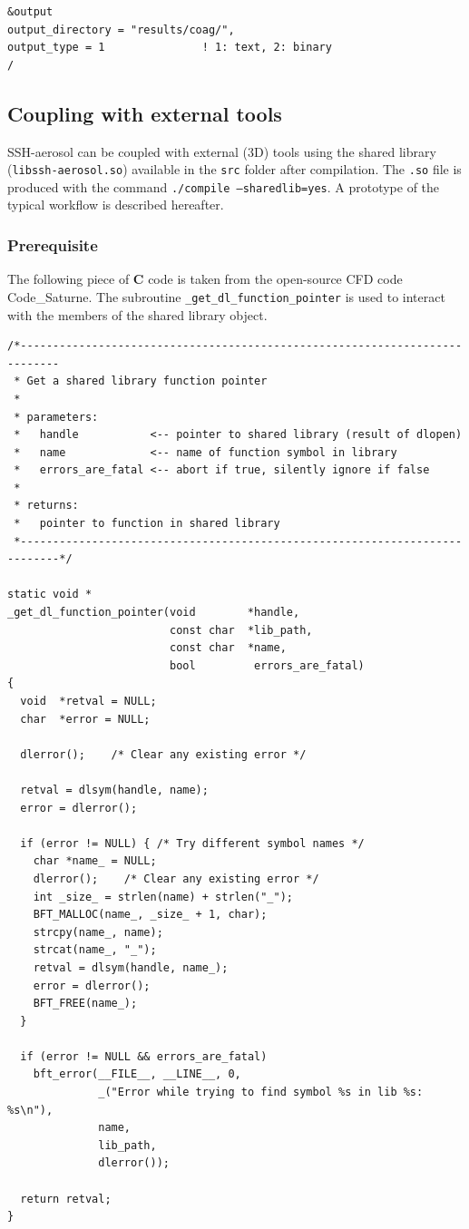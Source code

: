 \documentclass[a4paper,11pt]{article}
\begin{document}
\begin{verbatim}
&output
output_directory = "results/coag/", 
output_type = 1               ! 1: text, 2: binary
/
\end{verbatim}

\subsection{Coupling with external tools}

SSH-aerosol can be coupled with external (3D) tools using the shared library (\texttt{libssh-aerosol.so}) available in the \texttt{src} folder after compilation.
The \texttt{.so} file is produced with the command \texttt{./compile --sharedlib=yes}.
A prototype of the typical workflow is described hereafter.

\subsubsection*{Prerequisite}

The following piece of \textbf{C} code is taken from the open-source CFD code Code\_Saturne.
The subroutine \texttt{\_get\_dl\_function\_pointer} is used to interact with the members of the shared library object.

\begin{verbatim}
/*----------------------------------------------------------------------------
 * Get a shared library function pointer
 *
 * parameters:
 *   handle           <-- pointer to shared library (result of dlopen)
 *   name             <-- name of function symbol in library
 *   errors_are_fatal <-- abort if true, silently ignore if false
 *
 * returns:
 *   pointer to function in shared library
 *----------------------------------------------------------------------------*/

static void *
_get_dl_function_pointer(void        *handle,
                         const char  *lib_path,
                         const char  *name,
                         bool         errors_are_fatal)
{
  void  *retval = NULL;
  char  *error = NULL;

  dlerror();    /* Clear any existing error */

  retval = dlsym(handle, name);
  error = dlerror();

  if (error != NULL) { /* Try different symbol names */
    char *name_ = NULL;
    dlerror();    /* Clear any existing error */
    int _size_ = strlen(name) + strlen("_");
    BFT_MALLOC(name_, _size_ + 1, char);
    strcpy(name_, name);
    strcat(name_, "_");
    retval = dlsym(handle, name_);
    error = dlerror();
    BFT_FREE(name_);
  }

  if (error != NULL && errors_are_fatal)
    bft_error(__FILE__, __LINE__, 0,
              _("Error while trying to find symbol %s in lib %s: %s\n"),
              name,
              lib_path,
              dlerror());

  return retval;
}
\end{verbatim}
\end{document}
